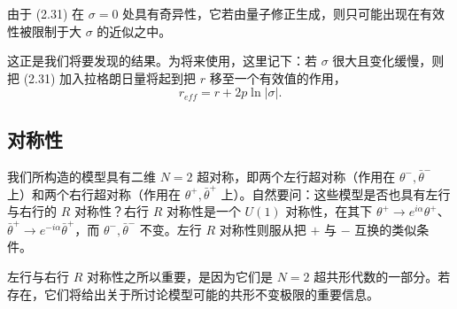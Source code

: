 
由于 (2.31) 在 $\sigma=0$ 处具有奇异性，它若由量子修正生成，则只可能出现在有效性被限制于大 $\sigma$ 的近似之中。

\label{op:14}

这正是我们将要发现的结果。为将来使用，这里记下：若 $\sigma$ 很大且变化缓慢，则把 (2.31) 加入拉格朗日量将起到把 $r$ 移至一个有效值的作用，
\begin{equation}\tag{2.33}
r_{eff}=r+2p\ln|\sigma|.
\end{equation}


\subsection*{对称性}

我们所构造的模型具有二维 $N=2$ 超对称，即两个左行超对称（作用在 $\theta^-,\bar\theta^-$ 上）和两个右行超对称（作用在 $\theta^+,\bar\theta^+$ 上）。自然要问：这些模型是否也具有左行与右行的 $R$ 对称性？右行 $R$ 对称性是一个 $U(1)$ 对称性，在其下 $\theta^+\to e^{i\alpha}\theta^+$、$\bar\theta^+\to e^{-i\alpha}\bar\theta^+$，而 $\theta^-,\bar\theta^-$ 不变。左行 $R$ 对称性则服从把 $+$ 与 $-$ 互换的类似条件。

左行与右行 $R$ 对称性之所以重要，是因为它们是 $N=2$ 超共形代数的一部分。若存在，它们将给出关于所讨论模型可能的共形不变极限的重要信息。

